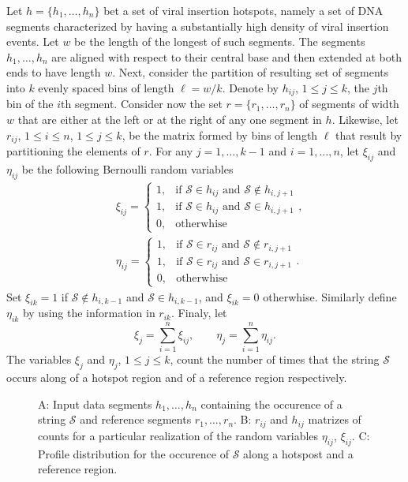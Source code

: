 \documentclass{bioinfo}
\begin{document}
Let $h = \{h_1, \ldots, h_n\}$ bet a set of viral insertion hotspots, namely a set of DNA segments characterized by having a substantially high density of viral insertion events. Let $w$ be the length of the longest of such segments. The segments $h_1, \ldots, h_n$ are aligned with respect to their central base and then extended at both ends to have length $w$. Next, consider the partition of resulting set of segments into $k$ evenly spaced bins of length $\ell = w/k$. Denote by $h_{ij}$, $1 \leq j \leq k$, the $j$th bin of the $i$th segment. Consider now the set $r= \{r_1, \ldots, r_n\}$ of segments of width $w$ that are either at the left or at the right of any one segment in $h$. Likewise, let $r_{ij}$, $1\leq i \leq n$, $1 \leq j \leq k$, be the matrix formed by bins of length $\ell$ that result by partitioning  the elements of $r$. For any $j = 1, \ldots, k-1$ and $i = 1, \ldots, n$, let $\xi_{ij}$ and $\eta_{ij}$ be the following Bernoulli random variables
\begin{align*}
   &\xi_{ij} = %
    \begin{cases}
     1, &\text{if } \mathcal S \in h_{ij} \text{ and } \mathcal S 
     \notin h_{i,j+1}\\
     1, &\text{if } \mathcal S \in h_{ij} \text{ and } \mathcal S 
     \in h_{i,j+1}\\
     0, &\text{otherwhise}
    \end{cases},\\
   &\eta_{ij} = %
    \begin{cases}
     1, &\text{if } \mathcal S \in r_{ij} \text{ and } \mathcal S 
     \notin r_{i,j+1}\\
     1, &\text{if } \mathcal S \in r_{ij} \text{ and } \mathcal S 
     \in r_{i,j+1}\\
     0, &\text{otherwhise}
    \end{cases}.
\end{align*}
Set $\xi_{ik}  = 1$ if $\mathcal S \notin h_{i,k-1}$ and $\mathcal S \in h_{i,k-1}$, and $\xi_{ik} = 0$ otherwhise. Similarly define $\eta_{ik}$ by using the information in $r_{ik}$. Finaly, let
\[
   \xi_j = \sum_{i=1}^n \xi_{ij}, \qquad 
   \eta_j = \sum_{i=1}^n \eta_{ij}.
\]
The variables $\xi_j$ and $\eta_j$, $1 \leq j \leq k$, count the number of times that the string $\mathcal S$ occurs along of a hotspot region and of a reference region respectively. 


\begin{figure}
 
 \label{fig:methodscheme}
 \caption{A: Input data segments $h_1, \ldots, h_n$ containing the occurence of a string $\mathcal S$ and reference segments $r_1, \ldots, r_n$. B: $r_{ij}$ and $h_{ij}$ matrizes of counts for a particular realization of the random variables $\eta_{ij}$, $\xi_{ij}$. C: Profile distribution for the occurence of $\mathcal S$ along a hotspost and a reference region.}
\end{figure}
\end{document}
